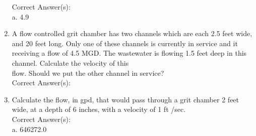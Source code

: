 \begin{enumerate}
Correct Answer(s):\\
a. 4.9


\vspace{0.4cm}
\item  A flow controlled grit chamber has two channels which are each 2.5 feet wide, and 20 feet long. Only one of these channels is currently in service and it receiving a flow of 4.5 MGD. The wastewater is flowing 1.5 feet deep in this channel. Calculate the velocity of this \\flow. Should we put the other channel in service?\\

Correct Answer(s): 

\vspace{0.4cm}
\item Calculate the flow, in gpd, that would pass through a grit chamber 2 feet wide, at a depth of 6 inches, with a velocity of 1 ft /sec.\\

Correct Answer(s):\\
a. 646272.0
\end{enumerate}



